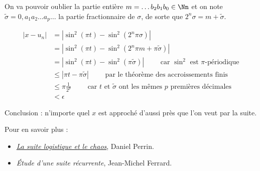 \documentclass[class=report,crop=false]{standalone}
\begin{document}
\begin{enumerate}
  On va pouvoir oublier la partie entière $m = \ldots b_2b_1b_0 \in \Nn$ et on note $\tilde \sigma 
  = 0,a_1 a_2 \ldots a_p\ldots$ la partie fractionnaire de $\sigma$, 
  de sorte que $2^n \sigma = m + \tilde  \sigma$.
  
  \begin{align*}
  |x-u_n| 
    &= \left| \sin^2(\pi t) - \sin^2(2^n \pi \sigma)\right| \\
   &= \left| \sin^2(\pi t) - \sin^2(2^n \pi m + \pi \tilde\sigma)\right| \\ 
    &=   \left| \sin^2(\pi t) - \sin^2(\pi \tilde\sigma)\right| 
      \qquad \text{ car $\sin^2$ est $\pi$-périodique}\\
    &\le  \left| \pi t - \pi \tilde\sigma\right| 
      \qquad \text{ par le théorème des accroissements finis}\\
    &\le  \pi \frac1{2^p}  
      \qquad \text{ car $t$ et $\tilde\sigma$ ont les mêmes $p$ premières décimales}\\
    &< \epsilon
  \end{align*}

  Conclusion : n'importe quel $x$ est approché d'aussi près que 
  l'on veut par la suite. 
  
\end{enumerate}


\bigskip

Pour en savoir plus : 
\begin{itemize}
  \item \href{http://www.math.u-psud.fr/~perrin/Conferences/logistiqueDP.pdf}
  {\emph{La suite logistique et le chaos}}, Daniel Perrin.
  
  \item %
  {\emph{\'Etude d’une suite récurrente}}, Jean-Michel Ferrard.
\end{itemize}

\finchapitre
\end{document}
